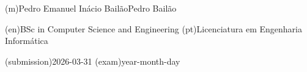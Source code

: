 


\ntauthorname(m){Pedro Emanuel Inácio Bailão}{Pedro Bailão}

\ntauthordegree(en){BSc in Computer Science and Engineering}
\ntauthordegree(pt){Licenciatura em Engenharia Informática}

\ntdate(submission){2026-03-31}
\ntdate(exam){year-month-day}

